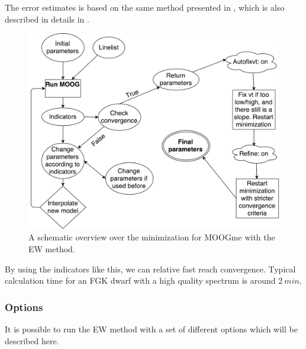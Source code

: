 \documentclass{aa}
\begin{document}
The error estimates is based on the same method presented in
\citet{Gonzalez2000}, which is also described in details in
\citet{Santos2003,Andreasen2016}.

\begin{figure}[tpb]
    \centering
    \includegraphics[width=1.0\linewidth]{figures/MOOGme_minimization.pdf}
    \caption{A schematic overview over the minimization for MOOGme with the
    EW method.}
    \label{fig:MOOGme_minimization}
\end{figure}

By using the indicators like this, we can relative fast reach convergence.
Typical calculation time for an FGK dwarf with a high quality spectrum is around
$\SI{2}{min}$.

\subsubsection{Options}
\label{subs:EWoptions}
It is possible to run the EW method with a set of different options which
will be described here.
\end{document}
